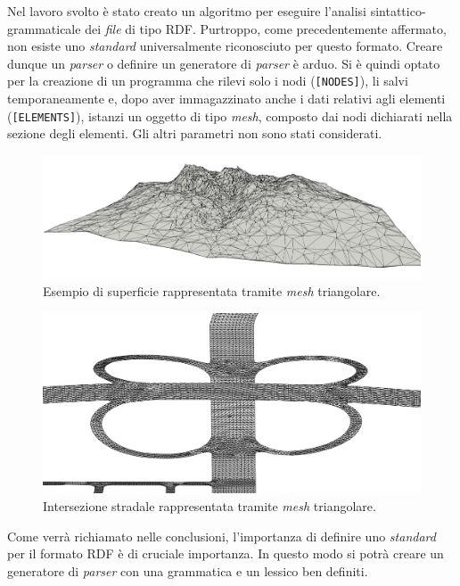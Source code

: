 Nel lavoro svolto è stato creato un algoritmo per eseguire l'analisi sintattico-grammaticale dei \textit{file} di tipo \ac{RDF}. Purtroppo, come precedentemente affermato, non esiste uno \textit{standard} universalmente riconosciuto per questo formato. Creare dunque un \textit{parser} o definire un generatore di \textit{parser} è arduo. Si è quindi optato per la creazione di un programma che rilevi solo i nodi (\texttt{[NODES]}), li salvi temporaneamente e, dopo aver immagazzinato anche i dati relativi agli elementi (\texttt{[ELEMENTS]}), istanzi un oggetto di tipo \textit{mesh}, composto dai nodi dichiarati nella sezione degli elementi. Gli altri parametri non sono stati considerati.

\begin{figure}
	\centering
	\includegraphics[width=0.7\linewidth]{Figures/mesh}
	\caption{Esempio di superficie rappresentata tramite \textit{mesh} triangolare.}
\end{figure}
\begin{figure}
	\centering
	\includegraphics[width=0.7\linewidth]{Figures/mesh_1}
	\caption{Intersezione stradale rappresentata tramite \textit{mesh} triangolare.}
\end{figure}

Come verrà richiamato nelle conclusioni, l'importanza di definire uno \textit{standard} per il formato \ac{RDF} è di cruciale importanza. In questo modo si potrà creare un generatore di \textit{parser} con una grammatica e un lessico ben definiti.